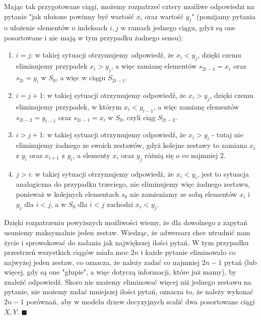 \documentclass[a4paper,12pt]{article}
\begin{document}
\noindent Mając tak przygotowane ciągi, możemy rozpatrzeć cztery możliwe odpowiedzi na pytanie "jak ułożone powinny być wartość $x_i$ oraz wartość $y_j$" (pomijamy pytania o ułożenie elementów o indeksach $i, j$ w ramach jednego ciągu, gdyż są one posortowane i nie mają w tym przypadku żadnego sensu):
\begin{enumerate}
\item $i = j$: w takiej sytuacji otrzymujemy odpowiedź, że $x_i < y_j$, dzięki czemu eliminujemy przypadek $x_i > y_j$, a więc zamianę elementów $s_{2i-1}=x_i$ oraz $s_{2i}=y_i$ w $S_0$, a więc w ciągu $S_{2i-1}$.
\item $i = j+1$: w takiej sytuacji otrzymujemy odpowiedź, że $x_i > y_j$, dzięki czemu eliminujemy przypadek, w którym $x_i < y_{i-1}$, a więc zamianę elementów  $s_{2i-2}=y_{i-1}$ oraz $s_{2i-1}=x_i$ w $S_0$, czyli ciąg $S_{2i-2}$.
\item $i > j + 1$: w takiej sytuacji otrzymujemy odpowiedź, że $x_i > y_i$ - tutaj nie eliminujemy żadnego ze swoich zestawów, gdyż kolejne zestawy to zamiana $x_i$ z $y_i$ oraz $x_{i+1}$ z $y_i$, a elementy $x_i$ oraz $y_j$ różnią się o co najmniej $2$.
\item $j > i$: w takiej sytuacji otrzymujemy odpowiedź, że $x_i < y_i$, jest to sytuacja analogiczna do przypadku trzeciego, nie eliminujemy więc żadnego zestawu, ponieważ w kolejnych elementach $s_k$ nie zamieniamy ze sobą elementów $x_i$ i $y_j$ dla $i < j$, a w $S_0$ dla $i < j$ zachodzi $x_i < y_j$.
\end{enumerate}
Dzięki rozpatrzeniu powyższych możliwości wiemy, że dla dowolnego z zapytań usuniemy maksymalnie jeden zestaw. Wiedząc, że adwersarz chce utrudnić nam życie i sprowokować do zadania jak największej ilości pytań. W tym przypadku przestrzeń wszystkich ciągów miała moc $2n$ i każde pytanie eliminowało co najwyżej jeden zestaw, co oznacza, że należy zadać co najmniej $2n-1$ pytań (lub więcej, gdy są one "głupie", a więc dotyczą informacji, które już mamy), by znaleźć odpowiedź. Skoro nie możemy eliminować więcej niż jednego zestawu na pytanie, nie możemy zadać mniejszej ilości pytań, oznacza to, że należy wykonać $2n-1$ porównań, aby w modelu drzew decyzyjnych scalić dwa posortowane ciągi $X, Y$. $\blacksquare$
\end{document}
